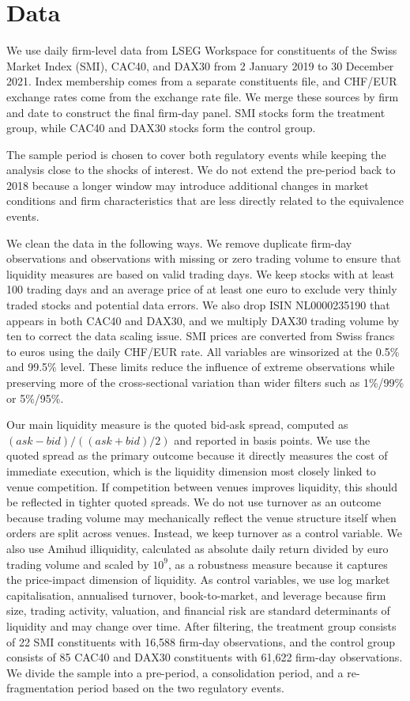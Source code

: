 \section{Data}
\label{sec:data}

We use daily firm-level data from LSEG Workspace for constituents of the Swiss Market Index (SMI), CAC40, and DAX30 from 2 January 2019 to 30 December 2021. Index membership comes from a separate constituents file, and CHF/EUR exchange rates come from the exchange rate file. We merge these sources by firm and date to construct the final firm-day panel. SMI stocks form the treatment group, while CAC40 and DAX30 stocks form the control group.

The sample period is chosen to cover both regulatory events while keeping the analysis close to the shocks of interest. We do not extend the pre-period back to 2018 because a longer window may introduce additional changes in market conditions and firm characteristics that are less directly related to the equivalence events.

We clean the data in the following ways. We remove duplicate firm-day observations and observations with missing or zero trading volume to ensure that liquidity measures are based on valid trading days. We keep stocks with at least 100 trading days and an average price of at least one euro to exclude very thinly traded stocks and potential data errors. We also drop ISIN NL0000235190 that appears in both CAC40 and DAX30, and we multiply DAX30 trading volume by ten to correct the data scaling issue. SMI prices are converted from Swiss francs to euros using the daily CHF/EUR rate. All variables are winsorized at the 0.5\% and 99.5\% level. These limits reduce the influence of extreme observations while preserving more of the cross-sectional variation than wider filters such as 1\%/99\% or 5\%/95\%.

Our main liquidity measure is the quoted bid-ask spread, computed as $(ask - bid)/((ask + bid)/2)$ and reported in basis points. We use the quoted spread as the primary outcome because it directly measures the cost of immediate execution, which is the liquidity dimension most closely linked to venue competition. If competition between venues improves liquidity, this should be reflected in tighter quoted spreads. We do not use turnover as an outcome because trading volume may mechanically reflect the venue structure itself when orders are split across venues. Instead, we keep turnover as a control variable.
We also use Amihud illiquidity, calculated as absolute daily return divided by euro trading volume and scaled by $10^9$, as a robustness measure because it captures the price-impact dimension of liquidity. As control variables, we use log market capitalisation, annualised turnover, book-to-market, and leverage because firm size, trading activity, valuation, and financial risk are standard determinants of liquidity and may change over time. After filtering, the treatment group consists of 22 SMI constituents with 16,588 firm-day observations, and the control group consists of 85 CAC40 and DAX30 constituents with 61,622 firm-day observations. We divide the sample into a pre-period, a consolidation period, and a re-fragmentation period based on the two regulatory events.

